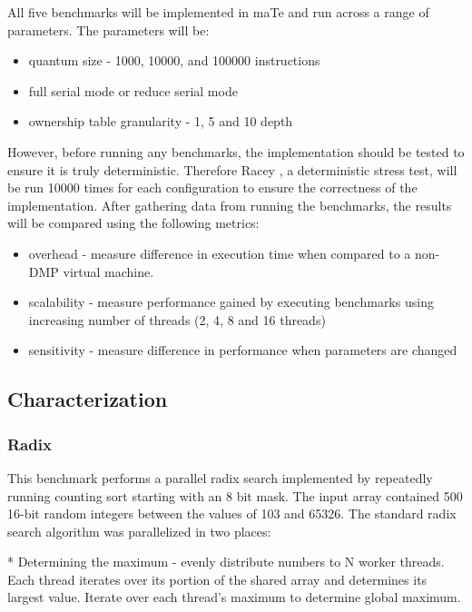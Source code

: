 All five benchmarks will be implemented in maTe and run across a range
of parameters.  The parameters will be:

\begin{itemize}
\item quantum size - 1000, 10000, and 100000 instructions

\item full serial mode or reduce serial mode

\item ownership table granularity - 1, 5 and 10 depth
\end{itemize}

However, before running any benchmarks, the implementation should be
tested to ensure it is truly deterministic.  Therefore Racey
\cite{racey}, a deterministic stress test, will be run 10000 times for
each configuration to ensure the correctness of the implementation.
After gathering data from running the benchmarks, the results will be
compared using the following metrics:

\begin{itemize}
\item overhead - measure difference in execution time when compared to
  a non-DMP virtual machine.

\item scalability - measure performance gained by executing benchmarks
  using increasing number of threads (2, 4, 8 and 16 threads)

\item sensitivity - measure difference in performance when parameters
  are changed
\end{itemize}

\subsection{Characterization}

\subsubsection{Radix}

This benchmark performs a parallel radix search implemented by
repeatedly running counting sort starting with an 8 bit mask.  The
input array contained 500 16-bit random integers between the values of
103 and 65326.  The standard radix search algorithm was parallelized in two places:

* Determining the maximum - evenly distribute numbers to N worker
threads.  Each thread iterates over its portion of the shared array
and determines its largest value.  Iterate over each thread's maximum
to determine global maximum.

